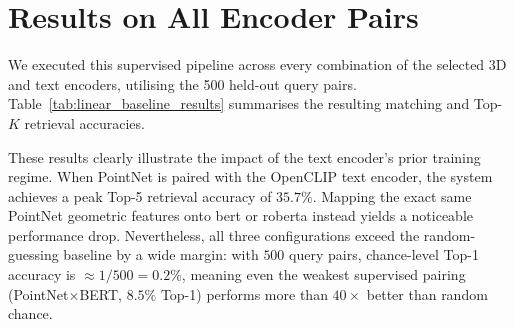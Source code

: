 \section{Results on All Encoder Pairs}
\label{sec:baseline_results}

We executed this supervised pipeline across every combination of the selected 3D and text encoders, utilising the 500 held-out query pairs. Table~\ref{tab:linear_baseline_results} summarises the resulting matching and Top-$K$ retrieval accuracies.

\begin{table}[htpb]
\centering
\renewcommand{\arraystretch}{1.2}
\caption{Retrieval and matching accuracy of the CCA + Affine baseline
across 500 unseen queries. The subspace dimension is fixed at $k=50$,
averaged over 3 random seeds. Models paired with \gls{clip} consistently
outperform purely linguistic encoders.}
\label{tab:linear_baseline_results}
\end{table}

These results clearly illustrate the impact of the text encoder's prior training regime. When PointNet is paired with the OpenCLIP text encoder, the system achieves a peak Top-5 retrieval accuracy of $35.7\%$. Mapping the exact same PointNet geometric features onto \gls{bert} or \gls{roberta} instead yields a noticeable performance drop. Nevertheless, all three configurations exceed the random-guessing baseline by a wide margin: with $500$ query pairs, chance-level Top-1 accuracy is $\approx 1/500 = 0.2\%$, meaning even the weakest supervised pairing (PointNet$\times$BERT, $8.5\%$ Top-1) performs more than $40\times$ better than random chance.

